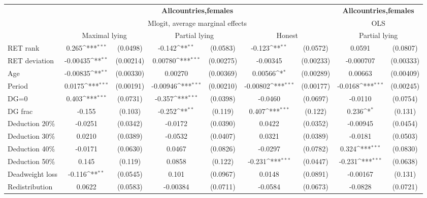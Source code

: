 \def\sym#1{\ifmmode^{#1}\else\(^{#1}\)\fi}
\begin{tabular}{l|cccccc|cc}
\hline\hline
&\multicolumn{6}{c|}{\bf All\space{}countries,\space{}females}&\multicolumn{2}{c}{\bf All\space{}countries,\space{}females}\\ &\multicolumn{6}{c|}{Mlogit, average marginal effects }&\multicolumn{2}{c}{OLS}\\
                &\multicolumn{2}{c}{Maximal lying}&\multicolumn{2}{c}{Partial lying}&\multicolumn{2}{c|}{Honest}  &\multicolumn{2}{c}{Partial lying}\\
\hline
RET rank        &    0.265\sym{***}& (0.0498)&   -0.142\sym{**} & (0.0583)&   -0.123\sym{**} & (0.0572)&   0.0591         & (0.0807)\\
RET deviation   & -0.00435\sym{**} &(0.00214)&  0.00780\sym{***}&(0.00275)& -0.00345         &(0.00233)&-0.000707         &(0.00333)\\
Age             & -0.00835\sym{**} &(0.00330)&  0.00270         &(0.00369)&  0.00566\sym{*}  &(0.00289)&  0.00663         &(0.00409)\\
Period          &   0.0175\sym{***}&(0.00191)& -0.00946\sym{***}&(0.00210)& -0.00802\sym{***}&(0.00177)&  -0.0168\sym{***}&(0.00245)\\
DG=0          &    0.403\sym{***}& (0.0731)&   -0.357\sym{***}& (0.0398)&  -0.0460         & (0.0697)&  -0.0110         & (0.0754)\\
DG frac         &   -0.155         &  (0.103)&   -0.252\sym{**} &  (0.119)&    0.407\sym{***}&  (0.122)&    0.236\sym{*}  &  (0.131)\\
Deduction 20\%&  -0.0251         & (0.0342)&  -0.0172         & (0.0390)&   0.0422         & (0.0352)& -0.00945         & (0.0454)\\
Deduction 30\%&   0.0210         & (0.0389)&  -0.0532         & (0.0407)&   0.0321         & (0.0389)&  -0.0181         & (0.0503)\\
Deduction 40\%&  -0.0171         & (0.0630)&   0.0467         & (0.0826)&  -0.0297         & (0.0782)&    0.324\sym{***}& (0.0830)\\
Deduction 50\%&    0.145         &  (0.119)&   0.0858         &  (0.122)&   -0.231\sym{***}& (0.0447)&   -0.231\sym{***}& (0.0638)\\
Deadweight loss&   -0.116\sym{**} & (0.0545)&    0.101         & (0.0967)&   0.0148         & (0.0891)& -0.00167         &  (0.131)\\
Redistribution&   0.0622         & (0.0583)& -0.00384         & (0.0711)&  -0.0584         & (0.0673)&  -0.0828         & (0.0721)\\

\end{tabular}

